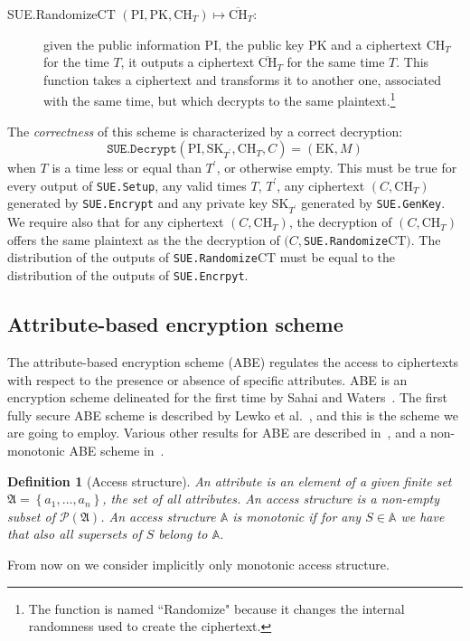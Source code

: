 \documentclass[a4paper,10pt]{article}
\newtheorem{definition}{Definition}
\newcommand{\powerset}[1]{\mathcal{P} \left( #1 \right) }
\newcommand{\mapssingleoutput}[2]{$ \left( #1 \right) \mapsto #2 $}
\newcommand{\singlefunction}[1]{\texttt{#1}}
\newcommand{\algorithmdefsingleoutput}[4]{\item[#1.#2 \mapssingleoutput{#3}{#4}:] }
\begin{document}
\begin{description}
		
		\algorithmdefsingleoutput{SUE}{Randomize$\mathrm{CT}$}{\mathrm{PI},\mathrm{PK},\mathrm{CH}_{T}}{\overline{\mathrm{CH}}_{T}} given the public information $\mathrm{PI}$, the public key $\mathrm{PK}$ and a ciphertext $\mathrm{CH}_{T}$ for the time $T$, it outputs a  ciphertext $\overline{\mathrm{CH}}_{T}$ for the same time $T$.
		This function takes a ciphertext and transforms it to another one, associated with the same time, but which decrypts to the same plaintext.\footnote{The function is named ``Randomize" because it changes the internal randomness used to create the ciphertext.} 
		
	\end{description}
	
	\noindent The \emph{correctness} of this scheme is characterized by a correct decryption:
	\[
		\singlefunction{SUE.Decrypt}(\mathrm{PI},\mathrm{SK}_{T^{\prime}},\mathrm{CH}_T,C)=(\mathrm{EK},M)
	\]
	when $T$ is a time less or equal than $T^{\prime}$, or otherwise empty.
	This must be true for every output of \singlefunction{SUE.Setup}, any valid times $T$, $T^{\prime}$, any ciphertext $(C,\mathrm{CH}_T)$ generated by \singlefunction{SUE.Encrypt} and any private key $\mathrm{SK}_{T^\prime}$ generated by \singlefunction{SUE.GenKey}.
	We require also that for any ciphertext $(C,\mathrm{CH}_T)$, the decryption of $(C,\mathrm{CH}_T)$ offers the same plaintext as the 
the decryption of $(C,$\singlefunction{SUE.Randomize$\mathrm{CT}$}$)$.
	The distribution of the outputs of \singlefunction{SUE.Randomize$\mathrm{CT}$} must be equal to the distribution of the outputs of \singlefunction{SUE.Encrpyt}.
	
	\subsection{Attribute-based encryption scheme}
	The attribute-based encryption scheme (ABE) regulates the access to ciphertexts with respect to the presence or absence of specific attributes.
	ABE is an encryption scheme delineated for the first time by Sahai and Waters~\cite{sahai2005}. The first fully secure ABE scheme is described by Lewko et al.~\cite{lewko2010ABE}, and this is the scheme we are going to employ. Various other results for ABE are described in~\cite{chase2007, garg2013, waters2011}, and a non-monotonic ABE scheme in~\cite{ostrovsky2007}.
	\begin{definition}[Access structure]
	\label{def.accessstructure}
	An \emph{attribute} is an element of a given finite set $\mathfrak{A}=\left\{a_1,\ldots,a_n\right\}$, the set of all attributes. An \emph{access structure} is a non-empty subset of $ \powerset{\mathfrak{A}}$. 
	An access structure $\mathbb{A}$ is \emph{monotonic}  if for any $S\in\mathbb{A}$  we have that also
	all supersets of $S$ belong to $\mathbb{A}$. 
	\end{definition}
	\noindent From now on we consider implicitly only monotonic access structure.
	
\end{document}
